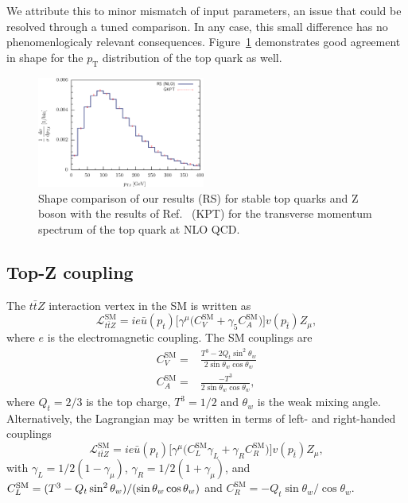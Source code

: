 \documentclass[preprint]{JHEP3} %
\newcommand{\mrm}{\mathrm}
\def\ttbZ{t\bar{t}Z}
\def\sw{\sin \theta_w}
\def\swsq{\sin^2 \theta_w}
\def\cw{\cos \theta_w}
\def\ConeVSM{C_{V}^{\mrm{SM}}}
\def\ConeASM{C_{A}^{\mrm{SM}}}
\begin{document}
We attribute this to minor mismatch of input parameters, an issue that could be resolved through a tuned comparison.  
In any case, this small difference has no phenomenlogicaly relevant consequences.
Figure~\ref{fig:i} demonstrates good agreement in shape for the $p_{\mathrm{T}}$ distribution of the top quark as well.
\begin{figure}[t]
\centering %
\includegraphics[width=0.49\textwidth]{./Troc_pTtop.eps}
\caption{\label{fig:i} Shape comparison of our results (RS) for stable top quarks and Z boson with the results of Ref.~\cite{1208} (KPT) for 
the transverse momentum spectrum of the top quark at NLO QCD. 
}
\end{figure}

\subsection{Top-Z coupling}
The $\ttbZ$ interaction vertex in the SM is written as
\begin{equation} \label{L_SM}
\mathcal{L}_{\ttbZ}^{\mrm{SM}} = i e \bar{u}(p_t)\biggl[ \gamma^{\mu} \bigl( \ConeVSM + \gamma_5 \ConeASM \bigr) \biggr]v(p_{\bar{t}}) Z_{\mu},
\end{equation}
where $e$ is the electromagnetic coupling. The SM couplings are 
\begin{equation}
\begin{split}
\ConeVSM =& \frac{T^3 - 2Q_t \swsq}{2\sw \cw} \\
\ConeASM =& \frac{-T^3}{2 \sw \cw},  
\end{split}
\end{equation}
where $Q_t = 2/3$ is the top charge, $T^3=1/2$ and $\theta_w$ is the weak mixing angle. Alternatively, the Lagrangian may be written in terms of left- and right-handed couplings
\begin{equation} \label{L_SM}
\mathcal{L}_{\ttbZ}^{\mrm{SM}} = i e \bar{u}(p_t)\biggl[ \gamma^{\mu} \bigl( C_{L}^{\mrm{SM}}\gamma_L + \gamma_R C_{R}^{\mrm{SM}} \bigr) \biggr]v(p_{\bar{t}}) Z_{\mu},
\end{equation}
with $\gamma_L=1/2(1-\gamma_{\mu})$, $\gamma_R=1/2(1+\gamma_{\mu})$, and $C_L^{\mrm{SM}}=(T^3 - Q_t \swsq) / (\sw \cw) \\$ and $C_R^{\mrm{SM}}=-Q_t\sw / \cw$. 
 
\end{document}

